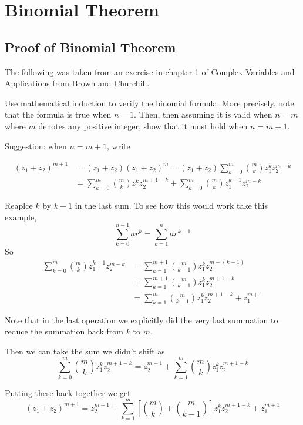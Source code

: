 \section{Binomial Theorem}

\subsection{Proof of Binomial Theorem}

The following was taken from an exercise in chapter 1 of Complex Variables and Applications
from Brown and Churchill.

Use mathematical induction to verify the binomial formula.
More precisely, note that the formula is true when $n=1$.
Then, then assuming it is valid when $n=m$ where $m$ denotes any positive integer,
show that it must hold when $n=m+1$.

Suggestion: when $n=m+1$, write

\begin{align*}
(z_1 + z_2)^{m+1} &=
(z_1 + z_2)(z_1 + z_2)^m =
(z_1 + z_2) \sum^{m}_{k=0} \binom{m}{k} z_{1}^{k} z_{2}^{m-k} \\
&= \sum^{m}_{k=0} \binom{m}{k} z_{1}^{k} z_{2}^{m+1-k} + \sum^{m}_{k=0} \binom{m}{k} z_{1}^{k+1} z_{2}^{m-k}
\end{align*}

Reaplce $k$ by $k-1$ in the last sum.
To see how this would work take this example,
$$
\sum^{n-1}_{k=0} ar^k =
\sum^{n  }_{k=1} ar^{k-1}
$$
So
\begin{align*}
\sum^{m}_{k=0}   \binom{m}{k} z_{1}^{k+1} z_{2}^{m-k} &=
\sum^{m+1}_{k=1} \binom{m}{k-1} z_{1}^{k} z_{2}^{m-(k-1)} \\
&= \sum^{m+1}_{k=1} \binom{m}{k-1} z_{1}^{k} z_{2}^{m+1-k} \\
&= \sum^{m}_{k=1} \binom{m}{k-1} z_{1}^{k} z_{2}^{m+1-k} + z_{1}^{m+1}
\end{align*}

Note that in the last operation we explicitly did the very last summation to reduce the summation
back from $k$ to $m$.


Then we can take the sum we didn't shift as
$$
\sum^{m}_{k=0} \binom{m}{k} z_{1}^{k} z_{2}^{m+1-k} =
z_{2}^{m+1} + \sum^{m}_{k=1} \binom{m}{k} z_{1}^{k} z_{2}^{m+1-k}
$$

Putting these back together we get
$$
(z_1 + z_2)^{m+1} =
z_{2}^{m+1} + 
\sum^{m}_{k=1} \left[ \binom{m}{k} + \binom{m}{k-1} \right] z_{1}^{k} z_{2}^{m+1-k} + z_{1}^{m+1}
$$

